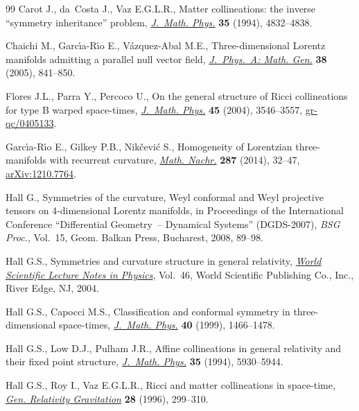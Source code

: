 \begin{thebibliography}{99}
Carot J., da~Costa J., Vaz E.G.L.R., Matter collineations: the inverse
 ``symmetry inheritance'' problem, \href{http://dx.doi.org/10.1063/1.530816}{\textit{J.~Math. Phys.}} \textbf{35} (1994),
 4832--4838.

Chaichi M., Garc{\'{\i}}a-R{\'{\i}}o E., V{\'a}zquez-Abal M.E.,
 Three-dimensional {L}orentz manifolds admitting a parallel null vector f\/ield,
 \href{http://dx.doi.org/10.1088/0305-4470/38/4/005}{\textit{J.~Phys.~A: Math. Gen.}} \textbf{38} (2005), 841--850.

Flores J.L., Parra Y., Percoco U., On the general structure of {R}icci
 collineations for type {B} warped space-times, \href{http://dx.doi.org/10.1063/1.1775875}{\textit{J.~Math. Phys.}}
 \textbf{45} (2004), 3546--3557, \href{http://arxiv.org/abs/gr-qc/0405133}{gr-qc/0405133}.

Garc{\'{\i}}a-R{\'{\i}}o E., Gilkey P.B., Nik{\v{c}}evi{\'c} S., Homogeneity of
 {L}orentzian three-manifolds with recurrent curvature, \href{http://dx.doi.org/10.1002/mana.201200302}{\textit{Math. Nachr.}}
 \textbf{287} (2014), 32--47, \href{http://arxiv.org/abs/1210.7764}{arXiv:1210.7764}.

Hall G., Symmetries of the curvature, {W}eyl conformal and {W}eyl projective
 tensors on 4-dimensional {L}orentz manifolds, in Proceedings of the
 {I}nternational {C}onference ``{D}if\/ferential {G}eometry~-- {D}ynamical
 {S}ystems'' ({DGDS}-2007), \textit{BSG Proc.}, Vol.~15, Geom. Balkan Press,
 Bucharest, 2008, 89--98.

Hall G.S., Symmetries and curvature structure in general relativity,
 \href{http://dx.doi.org/10.1142/1729}{\textit{World Scientific Lecture Notes in Physics}}, Vol.~46, World Scientif\/ic
 Publishing Co., Inc., River Edge, NJ, 2004.

Hall G.S., Capocci M.S., Classif\/ication and conformal symmetry in
 three-dimensional space-times, \href{http://dx.doi.org/10.1063/1.532815}{\textit{J.~Math. Phys.}} \textbf{40} (1999),
 1466--1478.

Hall G.S., Low D.J., Pulham J.R., Af\/f\/ine collineations in general relativity
 and their f\/ixed point structure, \href{http://dx.doi.org/10.1063/1.530720}{\textit{J.~Math. Phys.}} \textbf{35} (1994),
 5930--5944.

Hall G.S., Roy I., Vaz E.G.L.R., Ricci and matter collineations in space-time,
 \href{http://dx.doi.org/10.1007/BF02106969}{\textit{Gen. Relativity Gravitation}} \textbf{28} (1996), 299--310.


\end{thebibliography}
